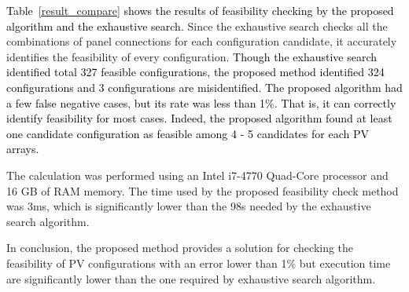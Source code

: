 \documentclass[conference]{pvsctran}
\newcommand{\michiko}{\textcolor{black}}
\begin{document}
\michiko{Table~\ref{result_compare} shows the results of feasibility checking by the proposed algorithm and the exhaustive search.} 
Since the exhaustive search checks all the combinations of panel connections for each configuration candidate, it accurately identifies the feasibility of every configuration. %
\michiko{Though the exhaustive search identified total 327 feasible configurations, the proposed method identified 324 configurations and 3 configurations are misidentified. 
The proposed algorithm had a few false negative cases, but its rate was less than 1\%.
That is, it can correctly identify feasibility for most cases. 
Indeed, the proposed algorithm found at least one candidate configuration as feasible among 4 - 5 candidates for each PV arrays. }

The calculation was performed using an Intel i7-4770 Quad-Core processor and 16 GB of RAM memory.
The time used by the proposed feasibility check method was 3ms, which is significantly lower than the 98s needed by the exhaustive search algorithm.

In conclusion, the proposed method provides a solution for checking the feasibility of PV configurations with an error lower than 1\% but execution time are significantly lower than the one required by exhaustive search algorithm.
\end{document}
